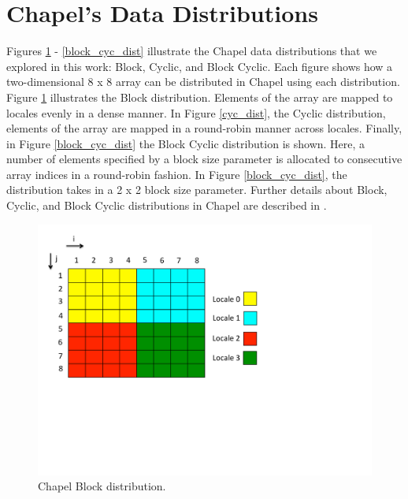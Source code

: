 \section{Chapel's Data Distributions}\label{sec:data_distributions} 

Figures \ref{block_dist} - \ref{block_cyc_dist} illustrate the Chapel data distributions that we explored in this work: Block, Cyclic, and Block Cyclic. Each figure shows how a two-dimensional 8 x 8 array can be distributed in Chapel using each distribution. Figure \ref{block_dist} illustrates the Block distribution. Elements of the array are mapped to locales evenly in a dense manner. In Figure \ref{cyc_dist}, the Cyclic distribution, elements of the array are mapped in a round-robin manner across locales. Finally, in Figure \ref{block_cyc_dist} the Block Cyclic distribution is shown. Here, a number of elements specified by a block size parameter is allocated to consecutive array indices in a round-robin fashion. In Figure \ref{block_cyc_dist}, the distribution takes in a 2 x 2 block size parameter. Further details about Block, Cyclic, and Block Cyclic distributions in Chapel are described in \cite{distributions}.

\begin{figure}
\begin{center}
\includegraphics[width=\linewidth]{./Figures/block_dist}
\caption{Chapel Block distribution.}
\label{block_dist}
\end{center}
\end{figure}

